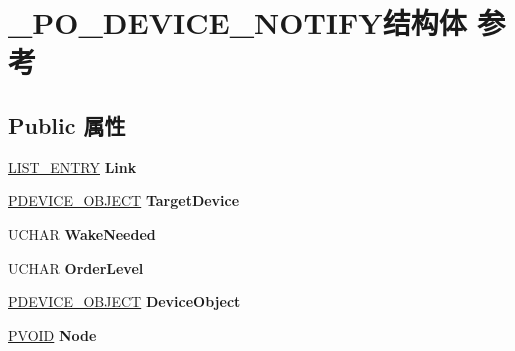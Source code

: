 \hypertarget{struct___p_o___d_e_v_i_c_e___n_o_t_i_f_y}{}\section{\+\_\+\+P\+O\+\_\+\+D\+E\+V\+I\+C\+E\+\_\+\+N\+O\+T\+I\+F\+Y结构体 参考}
\label{struct___p_o___d_e_v_i_c_e___n_o_t_i_f_y}
\subsection*{Public 属性}
\begin{DoxyCompactItemize}
\item 
\mbox{\label{struct___p_o___d_e_v_i_c_e___n_o_t_i_f_y_aa57396647f4a6f632c4923554df7458c}} 
\hyperlink{struct___l_i_s_t___e_n_t_r_y}{L\+I\+S\+T\+\_\+\+E\+N\+T\+RY} {\bfseries Link}
\item 
\mbox{\label{struct___p_o___d_e_v_i_c_e___n_o_t_i_f_y_aed8d09a590020065426e4fa1fc514f4b}} 
\hyperlink{struct___d_e_v_i_c_e___o_b_j_e_c_t}{P\+D\+E\+V\+I\+C\+E\+\_\+\+O\+B\+J\+E\+CT} {\bfseries Target\+Device}
\item 
\mbox{\label{struct___p_o___d_e_v_i_c_e___n_o_t_i_f_y_a2878085ffcc99480500e2cf5f2b77da0}} 
U\+C\+H\+AR {\bfseries Wake\+Needed}
\item 
\mbox{\label{struct___p_o___d_e_v_i_c_e___n_o_t_i_f_y_a67eb638ffa4d0fdb5aca67088c8c7527}} 
U\+C\+H\+AR {\bfseries Order\+Level}
\item 
\mbox{\label{struct___p_o___d_e_v_i_c_e___n_o_t_i_f_y_a63b2a865cf37a177a129f3c439bfa2c9}} 
\hyperlink{struct___d_e_v_i_c_e___o_b_j_e_c_t}{P\+D\+E\+V\+I\+C\+E\+\_\+\+O\+B\+J\+E\+CT} {\bfseries Device\+Object}
\item 
\mbox{\label{struct___p_o___d_e_v_i_c_e___n_o_t_i_f_y_afae4df2457622e1e247669c73276151b}} 
\hyperlink{interfacevoid}{P\+V\+O\+ID} {\bfseries Node}
\item 
\mbox{\label{struct___p_o___d_e_v_i_c_e___n_o_t_i_f_y_ac3e24ff9686bf2e11106723974013021}} 

\end{DoxyCompactItemize}
